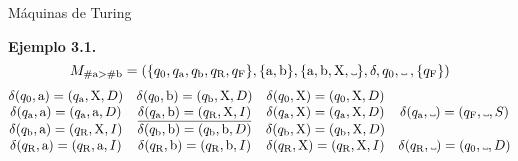 \documentclass[10pt,xcolor=dvipsnames,aspectratio=169,spanish]{beamer}
\newcommand\Vtextvisiblespace[1][.3em]{%
\mbox{\kern.06em\vrule height.3ex}%
\vbox{\hrule width#1}%
\hbox{\vrule height.3ex}}
\begin{document}
\begin{frame}{Máquinas de Turing}

\textbf{Ejemplo 3.1}\textbf{.}
$$
    M_{\#\text{a}>\#\text{b}}=(\{q_0, q_\text{a}, q_\text{b}, q_\text{R}, q_\text{F}\}, \{\text{a}, \text{b}\}, \{\text{a}, \text{b}, \text{X}, \Vtextvisiblespace\}, \delta, q_0, \Vtextvisiblespace\:,\{q_\text{F}\})
$$
$$
    \begin{matrix}
        \delta(q_0, \text{a}) = (q_\text{a},\text{X},D) & \delta(q_0, \text{b}) = (q_\text{b},\text{X},D) & \delta(q_0, \text{X}) = (q_0,\text{X},D) &  \\
        \delta(q_\text{a}, \text{a}) = (q_\text{a},\text{a},D) & \underline{\delta(q_\text{a}, \text{b}) = (q_\text{R},\text{X},I)} & \delta(q_\text{a}, \text{X}) = (q_\text{a},\text{X},D) & \delta(q_\text{a}, \Vtextvisiblespace) = (q_\text{F},\Vtextvisiblespace,S) \\
        \delta(q_\text{b}, \text{a}) = (q_\text{R},\text{X},I) & \delta(q_\text{b}, \text{b}) = (q_\text{b},\text{b},D) & \delta(q_\text{b}, \text{X}) = (q_\text{b},\text{X},D) &  \\
        \delta(q_\text{R}, \text{a}) = (q_\text{R},\text{a},I) & \delta(q_\text{R}, \text{b}) = (q_\text{R},\text{b},I) & \delta(q_\text{R}, \text{X}) = (q_\text{R},\text{X},I) & \delta(q_\text{R}, \Vtextvisiblespace) = (q_0,\Vtextvisiblespace,D) \\
    \end{matrix}
$$

\vspace{5mm}

\begin{adjustbox}{max height={.67\textheight},center}

\end{adjustbox}

\end{frame}
\end{document}
